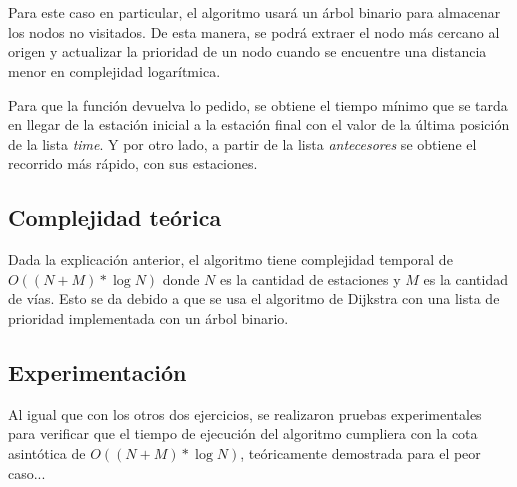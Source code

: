      \\~\\
    
    \par  Para este caso en particular, el algoritmo usará un árbol binario para almacenar los nodos no visitados. De esta manera, se podrá extraer el nodo más cercano al origen y actualizar la prioridad de un nodo cuando se encuentre una distancia menor en complejidad logarítmica.
    \par Para que la función devuelva lo pedido, se obtiene el tiempo mínimo que se tarda en llegar de la estación inicial a la estación final con el valor de la última posición de la lista \emph{time}. Y por otro lado, a partir de la lista \emph{antecesores} se obtiene el recorrido más rápido, con sus estaciones.
   
    \subsection{Complejidad teórica}
        Dada la explicación anterior, el algoritmo tiene complejidad temporal de $O((N+M) * \log N)$ donde $N$ es la cantidad de estaciones y $M$ es la cantidad de vías.
        Esto se da debido a que se usa el algoritmo de Dijkstra con una lista de prioridad implementada con un árbol binario.
    


    \subsection{Experimentación}

        Al igual que con los otros dos ejercicios, se realizaron pruebas experimentales para verificar que el tiempo de ejecución del algoritmo cumpliera con la cota asintótica de $O((N+M) * \log N)$, teóricamente demostrada para el peor caso...